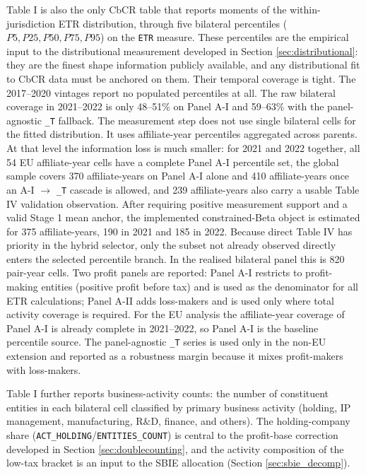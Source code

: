 \documentclass[11pt,a4paper]{article}
\newcommand{\code}[1]{\texttt{#1}}
\begin{document}
Table I is also the only CbCR table that reports moments of the within-jurisdiction ETR distribution, through five bilateral percentiles ($P5, P25, P50, P75, P95$) on the \code{ETR} measure. These percentiles are the empirical input to the distributional measurement developed in Section \ref{sec:distributional}: they are the finest shape information publicly available, and any distributional fit to CbCR data must be anchored on them. Their temporal coverage is tight. The 2017--2020 vintages report no populated percentiles at all. The raw bilateral coverage in 2021--2022 is only 48--51\% on Panel A-I and 59--63\% with the panel-agnostic \code{\_T} fallback. The measurement step does not use single bilateral cells for the fitted distribution. It uses affiliate-year percentiles aggregated across parents. At that level the information loss is much smaller: for 2021 and 2022 together, all 54 EU affiliate-year cells have a complete Panel A-I percentile set, the global sample covers 370 affiliate-years on Panel A-I alone and 410 affiliate-years once an A-I $\rightarrow$ \code{\_T} cascade is allowed, and 239 affiliate-years also carry a usable Table IV validation observation. After requiring positive measurement support and a valid Stage 1 mean anchor, the implemented constrained-Beta object is estimated for 375 affiliate-years, 190 in 2021 and 185 in 2022. Because direct Table IV has priority in the hybrid selector, only the subset not already observed directly enters the selected percentile branch. In the realised bilateral panel this is 820 pair-year cells. Two profit panels are reported: Panel A-I restricts to profit-making entities (positive profit before tax) and is used as the denominator for all ETR calculations; Panel A-II adds loss-makers and is used only where total activity coverage is required. For the EU analysis the affiliate-year coverage of Panel A-I is already complete in 2021--2022, so Panel A-I is the baseline percentile source. The panel-agnostic \code{\_T} series is used only in the non-EU extension and reported as a robustness margin because it mixes profit-makers with loss-makers.

Table I further reports business-activity counts: the number of constituent entities in each bilateral cell classified by primary business activity (holding, IP management, manufacturing, R\&D, finance, and others). The holding-company share (\code{ACT\_HOLDING}/\code{ENTITIES\_COUNT}) is central to the profit-base correction developed in Section \ref{sec:doublecounting}, and the activity composition of the low-tax bracket is an input to the SBIE allocation (Section \ref{sec:sbie_decomp}).
\end{document}
